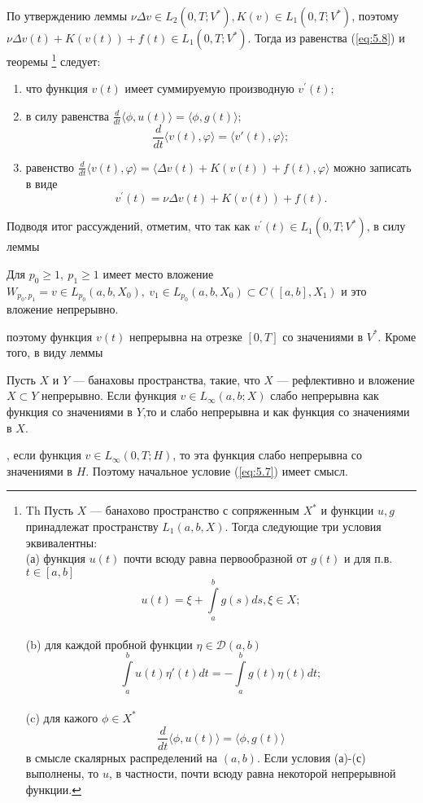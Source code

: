 По утверждению леммы $\nu\Delta v \in L_2(0, T; V^\ast), K(v) \in L_1(0, T; V^\ast)$, поэтому $\nu\Delta v(t) + K(v(t)) + f(t) \in L_1(0, T; V^\ast)$.
Тогда из равенства (\ref{eq:5.8}) и теоремы \footnote{Th Пусть $X$ --- банахово пространство с сопряженным $X^*$ и функции $u,g$  принадлежат пространству
$L_1(a,b,X).$ Тогда следующие три условия эквивалентны:\\
(а) функция $u(t)$ почти всюду равна первообразной от $g(t)$ и для п.в. $t\in[a,b]$ $$u(t)=\xi+\int\limits_a^b g(s)ds, \xi\in X;$$\\
(b) для каждой пробной функции $\eta\in\mathcal{D}(a,b)$ $$\int\limits_a^b u(t)\eta'(t)dt= -\int\limits_a^b g(t)\eta(t)dt;$$\\
(c) для кажого $\phi\in X^*$ $$\frac{d}{dt}\langle \phi, u(t) \rangle = \langle \phi, g(t) \rangle$$ в смысле скалярных распределений на $(a,b).$
Если условия (а)-(с) выполнены, то $u$, в частности, почти всюду равна некоторой непрерывной функции.} следует:
\begin{enumerate}
    \item что функция $v(t)$ имеет суммируемую производную $v^\prime(t);$
    \item в силу равенства $\frac{d}{dt}\langle \phi, u(t) \rangle = \langle \phi, g(t) \rangle;$
    $$\frac{d}{dt} \langle v(t), \varphi \rangle = \langle v'(t), \varphi \rangle;$$
    \item равенство $\frac{d}{dt}\langle v(t), \varphi \rangle=\langle \Delta v(t)+K(v(t))+f(t),\varphi\rangle$ можно записать в виде
    $$v^\prime(t)=\nu\Delta v(t)+K(v(t))+f(t).$$
\end{enumerate}

Подводя итог рассуждений, отметим, что так как $v^\prime(t) \in L_1(0, T; V^\ast)$, в силу леммы 
\begin{lemma}
Для $p_0\ge 1, \ p_1\ge 1$ имеет место вложение\linebreak
$W_{p_0,p_1}={v\in L_{p_0}(a,b,X_0), \ v_1\in L_{p_0}(a,b,X_0)}\subset C([a,b],X_1)$
и это вложение непрерывно.
\end{lemma}
поэтому функция $v(t)$ непрерывна на отрезке $[0, T]$ со значениями в $V^\ast$. 
Кроме того, в виду леммы
\begin{lemma}
Пусть $X$ и $Y$ --- банаховы пространства, такие, что $X$ --- рефлективно и вложение $X\subset Y$ непрерывно.
Если функция $v\in L_{\infty}(a,b;X)$ слабо непрерывна как функция со значениями в $Y$,то и слабо непрерывна и как функция со значениями в $X$.
\end{lemma}
 , если функция $v\in L_{\infty} (0,T;H)$, то эта функция слабо непрерывна со значениями в $H$. Поэтому начальное условие (\ref{eq:5.7}) имеет смысл.

